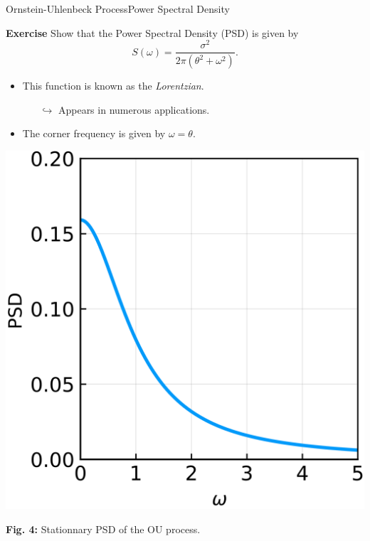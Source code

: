 \documentclass[usenames,dvipsnames,svgnames,10pt,aspectratio=169]{beamer}
\begin{document}
\begin{frame}[t, c]{Ornstein-Uhlenbeck Process}{Power Spectral Density}
	\begin{minipage}{.48\textwidth}
		\begin{block}{\centering \textbf{Exercise}}
			Show that the Power Spectral Density (PSD) is given by
				$$
				S(\omega) = \frac{\sigma^2}{2\pi \left( \theta^2 + \omega^2 \right)}.
				$$
		\end{block}

		\bigskip

		\begin{itemize}
			\item This function is known as the \emph{Lorentzian}.
			\begin{itemize}
				\item[$\hookrightarrow$] Appears in numerous applications.
			\end{itemize}

			\item The corner frequency is given by $\omega = \theta$.
		\end{itemize}
	\end{minipage}%
	\hfill
	\begin{minipage}{.48\textwidth}
		\centering
		\includegraphics[width=.75\columnwidth]{ornstein_uhlenbeck_process_psd}

		\small{
			\textbf{Fig. 4:} Stationnary PSD of the OU process.
			}
	\end{minipage}

	\vspace{1cm}
\end{frame}
\end{document}
